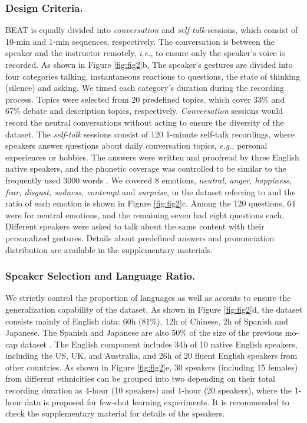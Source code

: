 \documentclass[runningheads]{llncs}
\begin{document}
\subsubsection{Design Criteria.} BEAT is equally divided into \textit{conversation} and \textit{self-talk} sessions, which consist of 10-min and 1-min sequences, respectively. 
The conversation is between the speaker and the instructor remotely, \textit{i.e.}, to ensure only the speaker's voice is recorded. As shown in Figure \ref{fig:fig2}b, The speaker's gestures are divided into four categories talking, instantaneous reactions to questions, the state of thinking (silence) and asking. We timed each category's duration during the recording process. Topics were selected from 20 predefined topics, which cover 33\% and 67\% debate and description topics, respectively. \textit{Conversation} sessions would record the neutral conversations without acting to ensure the diversity of the dataset.
The \textit{self-talk} sessions consist of 120 1-minute self-talk recordings, where speakers answer questions about daily conversation topics, \textit{e.g.}, personal experiences or hobbies. The answers were written and proofread by three English native speakers, and the phonetic coverage was controlled to be similar to the frequently used 3000 words \cite{hornbyoxford}. We covered 8 emotions, \textit{neutral, anger, happiness, fear, disgust, sadness, contempt} and \textit{surprise}, in the dataset referring to \cite{livingstone2018ryerson} and the ratio of each emotion is shown in Figure \ref{fig:fig2}c. Among the 120 questions, 64 were for neutral emotions, and the remaining seven had eight questions each. Different speakers were asked to talk about the same content with their personalized gestures. Details about predefined answers and pronunciation distribution are available in the supplementary materials.

\vspace{-0.5cm}

\subsubsection{Speaker Selection and Language Ratio.} We strictly control the proportion of languages as well as accents to ensure the generalization capability of the dataset. As shown in Figure \ref{fig:fig2}d, the dataset consists mainly of English data: 60h (81\%), 12h of Chinese, 2h of Spanish and Japanese. The Spanish and Japanese are also 50\% of the size of the previous mo-cap dataset \cite{ferstl2018investigating}. The English component includes 34h of 10 native English speakers, including the US, UK, and Australia, and 26h of 20 fluent English speakers from other countries. As shown in Figure \ref{fig:fig2}e, 30 speakers (including 15 females) from different ethnicities can be grouped into two depending on their total recording duration as 4-hour (10 speakers) and 1-hour (20 speakers), where the 1-hour data is proposed for few-shot learning experiments. It is recommended to check the supplementary material for details of the speakers.
\end{document}
